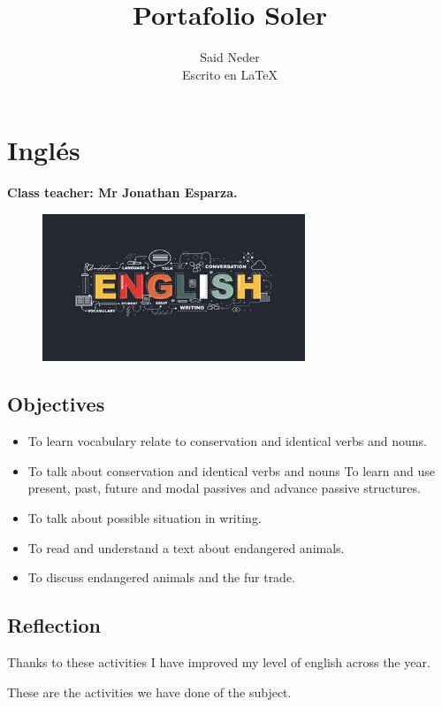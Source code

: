\documentclass[a4paper, 12pt]{article}
\title{Portafolio Soler}
\author{Said Neder\\Escrito en \LaTeX}
\begin{document}
\maketitle
\tableofcontents

\section{Inglés}
\textbf{Class teacher: Mr Jonathan Esparza.}

\begin{figure}[h]
  \includegraphics[width=0.7\textwidth, center]{english.jpeg}
\end{figure}

\subsection{Objectives}

\begin{itemize}
  \item To learn vocabulary relate to conservation and identical verbs and nouns.
  \item To talk about conservation and identical verbs and nouns
    To learn and use present, past, future and modal passives and advance passive structures.
  \item To talk about possible situation in writing.
  \item To read and understand a text about endangered animals.
  \item To discuss endangered animals and the fur trade.
\end{itemize}

\subsection{Reflection}
Thanks to these activities I have improved my level of english across the year.

These are the activities we have done of the subject.
\end{document}
